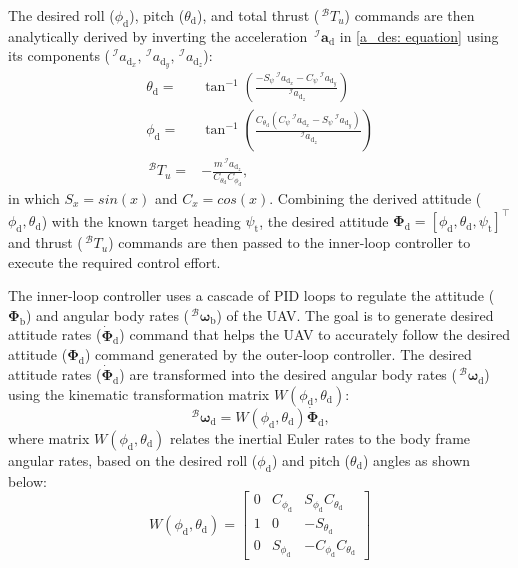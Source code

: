 The desired roll (${\phi}_{\text{d}}$), pitch (${\theta}_{\text{d}}$), and total thrust ($\,^\mathcal{B} T_u$) commands are then analytically derived by inverting the acceleration $\,^\mathcal{I}\boldsymbol{a}_{\text{d}}$ in \eqref{a_des: equation} using its components ($\,^\mathcal{I} {a}_{\text{d}_x}, \,^\mathcal{I} {a}_{\text{d}_y}, \,^\mathcal{I} {a}_{\text{d}_z}$):
\begin{align}
\label{euler_thrust_des: equation}
    {\theta}_{\text{d}} = & \tan^{-1}\left(\frac{- S_\psi \,^\mathcal{I} {a}_{\text{d}_x} - C_\psi \,^\mathcal{I} {a}_{\text{d}_y}}{\,^\mathcal{I} {a}_{\text{d}_z}} \right) \nonumber \\
    {\phi}_{\text{d}} = & \tan^{-1}\left(\frac{C_{\theta_{\text{d}}} \left(C_\psi \,^\mathcal{I} {a}_{\text{d}_x} - S_\psi \,^\mathcal{I} {a}_{\text{d}_y} \right)}{\,^\mathcal{I} {a}_{\text{d}_z}} \right) \nonumber \\
    \,^\mathcal{B} {T}_u = & - \frac{m \,^\mathcal{I} {a}_{\text{d}_z}}{C_{\theta_{\text{d}}} C_{\phi_{\text{d}}}},
\end{align}
in which $S_x = sin(x)$ and $C_x = cos(x)$.
Combining the derived attitude ($\phi_{\text{d}}, \theta_{\text{d}}$) with the known target heading $\psi_{\text{t}}$, the desired attitude $\boldsymbol{\Phi}_{\text{d}} = [\phi_{\text{d}}, \theta_{\text{d}}, \psi_{\text{t}}]^\top$ and thrust ($\,^\mathcal{B} T_u$) commands are then passed to the inner-loop controller to execute the required control effort.

The inner-loop controller uses a cascade of PID loops to regulate the attitude ($\boldsymbol{\Phi}_{\text{b}}$) and angular body rates ($\,^\mathcal{B} \boldsymbol{\omega}_{\text{b}}$) of the UAV.
The goal is to generate desired attitude rates ($\dot{\boldsymbol{\Phi}}_{\text{d}}$) command that helps the UAV to accurately follow the desired attitude ($\boldsymbol{\Phi}_{\text{d}}$) command generated by the outer-loop controller.
The desired attitude rates ($\dot{\boldsymbol{\Phi}}_{\text{d}}$) are transformed into the desired angular body rates ($\,^\mathcal{B} \boldsymbol{\omega}_{\text{d}}$) using the kinematic transformation matrix $W(\phi_{\text{d}} ,\theta_{\text{d}} )$:
\begin{equation}
\label{kinematic transformation: equation}
    \,^\mathcal{B} \boldsymbol{\omega}_{\text{d}} = W(\phi_{\text{d}} ,\theta_{\text{d}} ) \dot{\boldsymbol{\Phi}}_{\text{d}},
\end{equation}
where matrix $W(\phi_{\text{d}} ,\theta_{\text{d}} )$ relates the inertial Euler rates to the body frame angular rates, based on the desired roll ($\phi_{\text{d}}$) and pitch ($\theta_{\text{d}}$) angles as shown below:
\begin{equation}
    W(\phi_{\text{d}} ,\theta_{\text{d}} )=\begin{bmatrix} 0 & C_{\phi_{\text{d}}} & S_{\phi_{\text{d}}} C_{\theta_{\text{d}}} \\ 1 & 0 & -S_{\theta_{\text{d}}} \\ 0 & S_{\phi_{\text{d}}} & - C_{\phi_{\text{d}}} C_{\theta_{\text{d}}} \end{bmatrix}
\end{equation}

